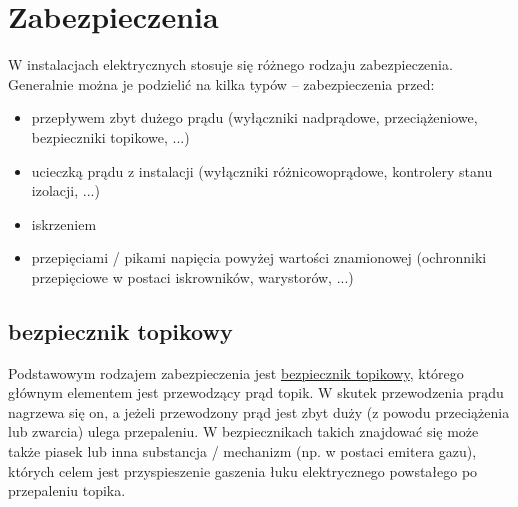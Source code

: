 % 
% 
% 
% 

\section{Zabezpieczenia}

W instalacjach elektrycznych stosuje się różnego rodzaju zabezpieczenia. Generalnie można je podzielić na kilka typów – zabezpieczenia przed:
\begin{itemize}
	\item przepływem zbyt dużego prądu (wyłączniki nadprądowe, przeciążeniowe, bezpieczniki topikowe, ...)
	\item ucieczką prądu z instalacji (wyłączniki różnicowoprądowe, kontrolery stanu izolacji, ...)
	\item iskrzeniem
	\item przepięciami / pikami napięcia powyżej wartości znamionowej (ochronniki przepięciowe w postaci iskrowników, warystorów, ...)
\end{itemize}

\subsection{bezpiecznik topikowy}

Podstawowym rodzajem zabezpieczenia jest \href{https://pl.wikipedia.org/wiki/Bezpiecznik_topikowy}{bezpiecznik topikowy}, którego głównym elementem jest przewodzący prąd topik.
W skutek przewodzenia prądu nagrzewa się on, a jeżeli przewodzony prąd jest zbyt duży (z powodu przeciążenia lub zwarcia) ulega przepaleniu.
W bezpiecznikach takich znajdować się może także piasek lub inna substancja / mechanizm (np. w postaci emitera gazu), których celem jest przyspieszenie gaszenia łuku elektrycznego powstałego po przepaleniu topika.

